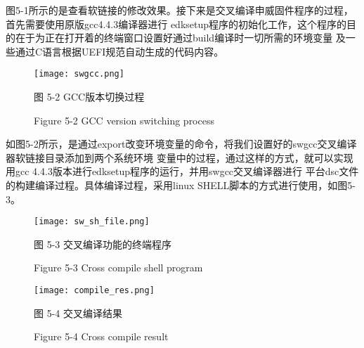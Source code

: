图5-1所示的是查看软链接的修改效果。接下来是交叉编译申威固件程序的过程，首先需要使用原版gcc4.4.3编译器进行
edksetup程序的初始化工作，这个程序的目的在于为正在打开着的终端窗口设置好通过build编译时一切所需的环境变量
及一些通过C语言根据UEFI规范自动生成的代码内容。

\begin{figure}[htb]
    \label{ffs_format}
    \vspace{0cm}   
    \setlength{\abovecaptionskip}{0.3cm}
	\centering
    \texttt{[image: swgcc.png]}
    \caption*{图 5-2 GCC版本切换过程}
    \setlength{\belowcaptionskip}{-0.7cm}
    \caption*{Figure 5-2 GCC version switching process}
\end{figure}

如图5-2所示，是通过export改变环境变量的命令，将我们设置好的swgcc交叉编译器软链接目录添加到两个系统环境
变量中的过程，通过这样的方式，就可以实现用gcc 4.4.3版本进行edksetup程序的运行，并用swgcc交叉编译器进行
平台dsc文件的构建编译过程。具体编译过程，采用linux SHELL脚本的方式进行使用，如图5-3。

\begin{figure}[H]
    \label{ffs_format}
    \vspace{0cm}   
    \setlength{\abovecaptionskip}{0.3cm}
	\centering
    \texttt{[image: sw\_sh\_file.png]}
    \caption*{图 5-3 交叉编译功能的终端程序}
    \setlength{\belowcaptionskip}{-0.7cm}
    \caption*{Figure 5-3 Cross compile shell program}
\end{figure}

\begin{figure}[htb]
    \label{ffs_format}
    \vspace{0cm}   
    \setlength{\abovecaptionskip}{0.3cm}
	\centering
    \texttt{[image: compile\_res.png]}
    \caption*{图 5-4 交叉编译结果}
    \setlength{\belowcaptionskip}{-0.7cm}
    \caption*{Figure 5-4 Cross compile result}
\end{figure}

